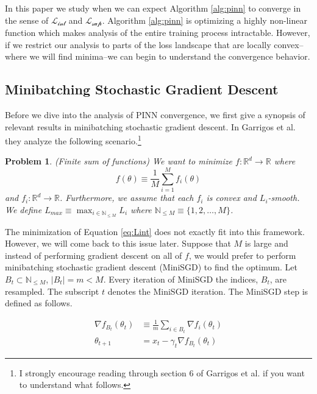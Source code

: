 \documentclass[12pt]{article}
\newtheorem{problem}{Problem}
\def\t{\text}
\begin{document}
In this paper we study when we can expect Algorithm \ref{alg:pinn} to converge in the sense of $\mathcal{L_{\t{int}}}$ and $\mathcal{L_{\text{sup}}}$. Algorithm \ref{alg:pinn} is optimizing a highly non-linear function which makes analysis of the entire training process intractable. However, if we restrict our analysis to parts of the loss landscape that are locally convex--where we will find minima--we can begin to understand the convergence behavior.

\subsection{Minibatching Stochastic Gradient Descent}

Before we dive into the analysis of PINN convergence, we first give a synopsis of relevant results in minibatching stochastic gradient descent. In Garrigos et al. \cite{gd} they analyze the following scenario.\footnote{I strongly encourage reading through section 6 of Garrigos et al. \cite{gd} if you want to understand what follows.}

\begin{problem} \label{prob:sum}
    (Finite sum of functions) We want to minimize $f: \mathbb{R}^d \to \mathbb{R}$
    where
    \begin{equation} \label{eq:f}
        f(\theta) \equiv \frac{1}{M} \sum_{i=1}^{M} f_i(\theta)
    \end{equation}
    and $f_i: \mathbb{R}^d \to \mathbb{R}$. Furthermore, we assume that each $f_i$ is convex and $L_i$-smooth. We define $L_{max} \equiv \max_{i \in \mathbb{N}_{\leq M}} L_i$ where $\mathbb{N}_{\leq M} \equiv \{1,2,\hdots, M \}$.
\end{problem}

The minimization of Equation \ref{eq:Lint} does not exactly fit into this framework. However, we will come back to this issue later. Suppose that $M$ is large and instead of performing gradient descent on all of $f$, we would prefer to perform minibatching stochastic gradient descent (MiniSGD) to find the optimum. Let $B_t \subset \mathbb{N}_{\leq M}$, $|B_t| = m < M$. Every iteration of MiniSGD the indices, $B_t$, are resampled. The subscript $t$ denotes the MiniSGD iteration. The MiniSGD step is defined as follows.

\begin{align}
    \nabla f_{B_t}(\theta_t) &\equiv \frac{1}{m} \sum_{i \in B_t} \nabla f_i(\theta_t)\\
    \theta_{t+1} &= x_t - \gamma_t \nabla f_{B_t}(\theta_t)
\end{align}
\end{document}
